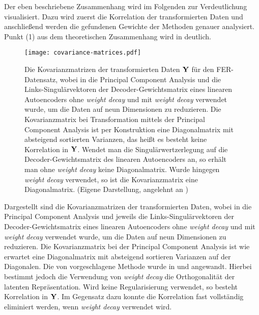 Der eben beschriebene Zusammenhang wird im Folgenden zur Verdeutlichung visualisiert. Dazu wird
zuerst die Korrelation der transformierten Daten und anschließend werden die gefundenen Gewichte
der Methoden genauer analysiert. Punkt (1) aus dem theoretischen Zusammenhang wird in
 deutlich.
\begin{figure}[ht]
	\centering
	\texttt{[image: covariance-matrices.pdf]}
	\caption[Kovarianzmatrizen der transformierten Daten $\mat{Y}$ für den FER-Datensatz von drei Methoden]{Die Kovarianzmatrizen der transformierten Daten $\mat{Y}$ für den FER-Datensatz, wobei in \captiona die Principal Component Analysis und die Links-Singulärvektoren der Decoder-Gewichtsmatrix eines linearen Autoencoders \captionb ohne \textit{weight decay} und \captionc mit \textit{weight decay} verwendet wurde, um die Daten auf neun Dimensionen zu reduzieren. Die Kovarianzmatrix bei Transformation mittels der Principal Component Analysis ist per Konstruktion eine Diagonalmatrix mit absteigend sortierten Varianzen, das heißt es besteht keine Korrelation in $\mat{Y}$. Wendet man die Singulärwertzerlegung auf die Decoder-Gewichtsmatrix des linearen Autoencoders an, so erhält man ohne \textit{weight decay} keine Diagonalmatrix. Wurde hingegen \textit{weight decay} verwendet, so ist die Kovarianzmatrix eine Diagonalmatrix. (Eigene Darstellung, angelehnt an \textcite[5]{Plaut.2018})}
	\label{fig:Kovarianzmatrizen}
\end{figure} Dargestellt sind die Kovarianzmatrizen der transformierten Daten, wobei in \captiona die Principal Component Analysis und jeweils die Links-Singulärvektoren der Decoder-Gewichtsmatrix eines linearen Autoencoders \captionb ohne \textit{weight decay} und \captionc mit \textit{weight decay} verwendet wurde, um die Daten auf neun Dimensionen zu reduzieren. Die Kovarianzmatrix bei der Principal Component Analysis ist wie erwartet eine Diagonalmatrix mit absteigend sortieren Varianzen auf der Diagonalen. Die von \textcite{Plaut.2018} vorgeschlagene Methode wurde in \captionb und \captionc angewandt. Hierbei bestimmt jedoch die Verwendung von \textit{weight decay} die Orthogonalität der latenten Repräsentation. Wird keine Regularisierung verwendet, so besteht Korrelation in $\mat{Y}$. Im Gegensatz dazu konnte die Korrelation fast vollständig eliminiert werden, wenn \textit{weight decay} verwendet wird.


